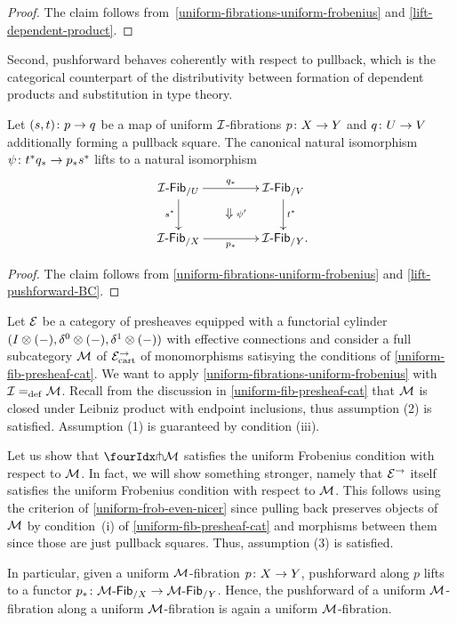 \documentclass[reqno,10pt,a4paper,oneside,draft]{amsart}
\begin{document}
\begin{proof}
The claim follows from~\cref{uniform-fibrations-uniform-frobenius} and \cref{lift-dependent-product}.
\end{proof}

Second, pushforward behaves coherently with respect to pullback, which is the categorical counterpart of the distributivity between formation of dependent products and substitution in type theory.

\begin{corollary} \label{uniform-fibrations-BC-pushforward}
Let $(s, t) \co p \to q$ be a map of uniform $\cal{I}$-fibrations $p \co X \to Y$ and $q \co U \to V$ additionally forming a pullback square.
The canonical natural isomorphism $\psi \co t^* q_* \to p_* s^*$ lifts to a natural isomorphism
\[
\xymatrix@C+2em{
  \Fib{\cal{I}}_{/U}
  \ar[r]^{q_*}
  \ar[d]_{s^*}
  \ar@{}[dr]|{\textstyle\Downarrow \rlap{$\labelstyle \psi'$}}
&
  \Fib{\cal{I}}_{/V}
  \ar[d]^{t^*}
\\
  \Fib{\cal{I}}_{/X}
  \ar[r]_{p_*}
&
  \Fib{\cal{I}}_{/Y}
\rlap{.}}
\]
\end{corollary}

\begin{proof}
The claim follows from \cref{uniform-fibrations-uniform-frobenius} and \cref{lift-pushforward-BC}.
\end{proof}

\begin{example} \label{frobenius-uniform-presheaf}
Let $\catE$ be a category of presheaves equipped with a functorial cylinder $(\interval \otimes (-), \lcyl \otimes (-), \rcyl \otimes (-))$ with effective connections and consider a full subcategory $\cal{M}$ of $\catE^\to_{\cart}$ of monomorphisms satisying the conditions of \cref{uniform-fib-presheaf-cat}.
We want to apply \cref{uniform-fibrations-uniform-frobenius} with $\cal{I} \defeq \cal{M}$.
Recall from the discussion in \cref{uniform-fib-presheaf-cat} that $\cal{M}$ is closed under Leibniz product with endpoint inclusions, thus assumption (2) is satisfied.
Assumption (1) is guaranteed by condition (iii).

Let us show that $\liftr{\cal{M}}$ satisfies the uniform Frobenius condition with respect to $\cal{M}$.
In fact, we will show something stronger, namely that $\catE^\to$ itself satisfies the uniform Frobenius condition with respect to $\cal{M}$.
This follows using the criterion of \cref{uniform-frob-even-nicer} since pulling back preserves objects of $\cal{M}$ by condition~(i) of \cref{uniform-fib-presheaf-cat} and morphisms between them since those are just pullback squares.
Thus, assumption (3) is satisfied.

In particular, given a uniform $\cal{M}$-fibration $p \co X \to Y$, pushforward along $p$ lifts to a functor $p_* \co \Fib{\cal{M}}_{/X} \to \Fib{\cal{M}}_{/Y}$.
Hence, the pushforward of a uniform $\cal{M}$-fibration along a uniform $\cal{M}$-fibration is again a uniform $\cal{M}$-fibration.
\end{example}
\end{document}
